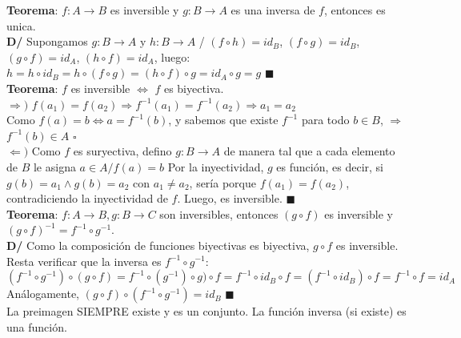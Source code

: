 \documentclass[11pt,a4paper]{article}
\newcommand*{\QEDA}{\null\nobreak\hfill\ensuremath{\blacksquare}}
\newcommand*{\QEDB}{\null\nobreak\hfill\ensuremath{\square}}
\begin{document}
\noindent \textbf{Teorema}: $f : A \rightarrow B$ es inversible y $g : B \rightarrow A$ es una inversa de $f$, entonces es unica.\\
\textbf{D/} Supongamos $g:B \rightarrow A$ y $h:B \rightarrow A$ / $(f \circ h) = id_B$, $(f \circ g) = id_B$, $(g \circ f) = id_A$, $(h \circ f) = id_A$, luego: $h = h \circ id_B = h \circ (f \circ g) = (h \circ f) \circ g = id_A \circ g = g$ \QEDA\\

\noindent \textbf{Teorema}: $f$ es inversible $\iff$ $f$ es biyectiva.\\
$\Rightarrow)$ $f(a_1)=f(a_2) \Rightarrow f^{-1}(a_1) = f^{-1}(a_2) \Rightarrow a_1=a_2$\\
\indent Como $f(a)=b \iff a = f^{-1}(b)$, y sabemos que existe $f^{-1}$ para todo $b \in B$, $\Rightarrow$ $f^{-1}(b) \in A$ \QEDB\\
$\Leftarrow)$ Como $f$ es suryectiva, defino $g:B\rightarrow A$ de manera tal que a cada elemento de $B$ le asigna $a\in A / f(a)=b$
Por la inyectividad, $g$ es funci\'on, es decir, si $g(b)=a_1 \land g(b)=a_2$ con $a_1\not=a_2$, ser\'ia porque $f(a_1)=f(a_2)$, contradiciendo la inyectividad de $f$. Luego, es inversible. \QEDA\\

\noindent \textbf{Teorema}: $f : A \rightarrow B, g: B \rightarrow C$ son inversibles, entonces $(g \circ f)$ es inversible y $(g \circ f)^{-1} = f^{-1} \circ g^{-1}$.\\
\textbf{D/} Como la composici\'on de funciones biyectivas es biyectiva, $g\circ f$ es inversible.\\ Resta verificar que la inversa es $f^{-1} \circ g^{-1}$: \\
$(f^{-1} \circ g^{-1})\circ(g \circ f) = f^{-1} \circ (g^{-1})\circ g) \circ f = f^{-1} \circ id_B \circ f = (f^{-1} \circ id_B) \circ f = f^{-1} \circ f = id_A$\\
An\'alogamente, $(g \circ f) \circ (f^{-1} \circ g^{-1}) = id_B$ \QEDA\\

\noindent La preimagen SIEMPRE existe y es un conjunto. La funci\'on inversa (si existe) es una funci\'on.\\
\end{document}
